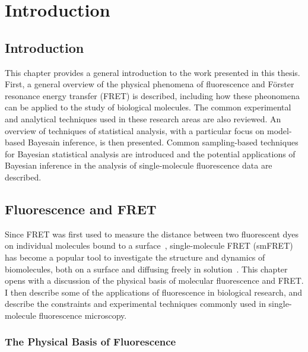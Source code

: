 \chapter{Introduction}
\label{chap:intro}
\section{Introduction}
This chapter provides a general introduction to the work presented in this thesis. First, a general overview of the physical phenomena of fluorescence and F\"{o}rster resonance energy transfer (FRET) is described, including how these pheonomena can be applied to the study of biological molecules. The common experimental and analytical techniques used in these research areas are also reviewed. An overview of techniques of statistical analysis, with a particular focus on model-based Bayesain inference, is then presented. Common sampling-based techniques for Bayesian statistical analysis are introduced and the potential applications of Bayesian inference in the analysis of single-molecule fluorescence data are described.

\section{Fluorescence and FRET}
Since FRET was first used to measure the distance between two fluorescent dyes on individual molecules bound to a surface~\cite{ha96}, single-molecule FRET (smFRET) has become a popular tool to investigate the structure and dynamics of biomolecules, both on a surface and diffusing freely in solution~\cite{haran03, schuler02, weiss00}. This chapter opens with a discussion of the physical basis of molecular fluorescence and FRET. I then describe some of the applications of fluorescence in biological research, and describe the constraints and experimental techniques commonly used in single-molecule fluorescence microscopy.

\subsection{The Physical Basis of Fluorescence}

